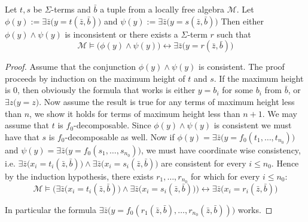 \documentclass[a4paper,11pt]{article}
\begin{document}
\begin{lemma}\label{Equalities}
Let $t,s$ be $\Sigma$-terms and $\bar b$ a tuple from a locally free algebra $\mathcal{M}$. Let $\phi(y):=\exists \bar z\big(y=t(\bar z, \bar b)\big)$ and $\psi(y):=\exists \bar z\big(y=s(\bar z, \bar b)\big)$ Then either $\phi(y)\land\psi(y)$ is inconsistent or there exists a $\Sigma$-term $r$ such that 
\[\mathcal{M}\models \big(\phi(y)\land \psi(y)\big) \leftrightarrow \exists \bar z\big(y=r(\bar z, \bar b)\big)\]
\end{lemma}
\begin{proof}
Assume that the conjunction $\phi(y)\land\psi(y)$ is consistent. The proof proceeds by induction on the maximum height of $t$ and $s$. If the maximum height is $0$, then obviously the formula that works is either $y=b_i$ for some $b_i$ from $\bar b$, or $\exists z\big(y=z\big)$. Now assume the result is true for any terms of maximum height less than $n$, we show it holds for terms of maximum height less than $n+1$. We may assume that $t$ is $f_0$-decomposable. Since $\phi(y)\land\psi(y)$ is consistent we must have that $s$ is $f_0$-decomposable as well. Now if $\phi(y)=\exists \bar z\big(y=f_0(t_1, \ldots, t_{n_0})\big)$ and $\psi(y)=\exists \bar z\big(y=f_0(s_1, \ldots, s_{n_0})\big)$, we must have  coordinate wise consistency, i.e. $\exists\bar z\big(x_i=t_i(\bar z, \bar b)\big)\land \exists\bar z\big(x_i=s_i(\bar z, \bar b)\big)$ are consistent for every $i\leq n_0$. Hence by the induction hypothesis, there exists $r_1, \ldots, r_{n_0}$ for which for every $i\leq n_0$: 
$$\mathcal{M}\models\Big(\exists\bar z\big(x_i=t_i(\bar z, \bar b)\big)\land \exists\bar z\big(x_i=s_i(\bar z, \bar b)\big)\Big)\leftrightarrow \exists \bar z\big(x_i=r_i(\bar z, \bar b)\big)$$  

In particular the formula $\exists \bar z\big(y=f_0(r_1(\bar z, \bar b), \ldots, r_{n_0}(\bar z, \bar b))\big)$ works.
\end{proof}
\end{document}
